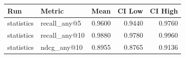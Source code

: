 \begin{tabular}{llrrr}
\toprule
Run & Metric & Mean & CI Low & CI High \\
\midrule
statistics & recall\_any@5 & 0.9600 & 0.9440 & 0.9760 \\
statistics & recall\_any@10 & 0.9880 & 0.9780 & 0.9960 \\
statistics & ndcg\_any@10 & 0.8955 & 0.8765 & 0.9136 \\
\bottomrule
\end{tabular}
